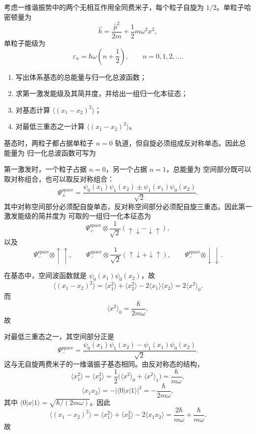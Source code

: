 \begin{question}
考虑一维谐振势中的两个无相互作用全同费米子，每个粒子自旋为 $1/2$。单粒子哈密顿量为
\[
\hat h=\frac{\hat p^2}{2m}+\frac12 m\omega^2 x^2,
\]
单粒子能级为
\[
\varepsilon_n=\hbar\omega\left(n+\frac12\right),
\qquad n=0,1,2,\dots.
\]

\begin{enumerate}[label=(\arabic*),leftmargin=2.5em]
  \item 写出体系基态的总能量与归一化总波函数；
  \item 求第一激发能级及其简并度，并给出一组归一化本征态；
  \item 对基态计算 $\langle (x_1-x_2)^2\rangle$；
  \item 对最低三重态之一计算 $\langle (x_1-x_2)^2\rangle$。
\end{enumerate}

\begin{solution}
基态时，两粒子都占据单粒子 $n=0$ 轨道，但自旋必须组成反对称单态。因此总能量为
归一化总波函数可写为

第一激发时，一个粒子占据 $n=0$，另一个占据 $n=1$，总能量为
空间部分既可以取对称组合，也可以取反对称组合：
\[
\Psi_{\pm}^{\text{space}}=\frac{\psi_0(x_1)\psi_1(x_2)\pm \psi_1(x_1)\psi_0(x_2)}{\sqrt2}.
\]
其中对称空间部分必须配自旋单态，反对称空间部分必须配自旋三重态。因此第一激发能级的简并度为
可取的一组归一化本征态为
\[
\Psi_+^{\text{space}}\otimes \frac{1}{\sqrt2}(\uparrow\downarrow-\downarrow\uparrow),
\]
以及
\[
\Psi_-^{\text{space}}\otimes \uparrow\uparrow,
\qquad
\Psi_-^{\text{space}}\otimes \frac{1}{\sqrt2}(\uparrow\downarrow+\downarrow\uparrow),
\qquad
\Psi_-^{\text{space}}\otimes \downarrow\downarrow.
\]

在基态中，空间波函数就是 $\psi_0(x_1)\psi_0(x_2)$，故
\[
\langle (x_1-x_2)^2\rangle=\langle x_1^2\rangle+\langle x_2^2\rangle-2\langle x_1\rangle\langle x_2\rangle=2\langle x^2\rangle_0.
\]
而
\[
\langle x^2\rangle_0=\frac{\hbar}{2m\omega},
\]
故

对最低三重态之一，其空间部分正是
\[
\Psi_-^{\text{space}}=\frac{\psi_0(x_1)\psi_1(x_2)-\psi_1(x_1)\psi_0(x_2)}{\sqrt2}.
\]
这与无自旋两费米子的一维谐振子基态相同。由反对称态的结构，
\[
\langle x_1^2\rangle=\langle x_2^2\rangle=\frac12\bigl(\langle x^2\rangle_0+\langle x^2\rangle_1\bigr)=\frac{\hbar}{m\omega},
\]
\[
\langle x_1 x_2\rangle=-|\langle 0|x|1\rangle|^2=-\frac{\hbar}{2m\omega},
\]
其中 $\langle 0|x|1\rangle=\sqrt{\hbar/(2m\omega)}$。因此
\[
\langle (x_1-x_2)^2\rangle
=\langle x_1^2\rangle+\langle x_2^2\rangle-2\langle x_1 x_2\rangle
=\frac{2\hbar}{m\omega}+\frac{\hbar}{m\omega}.
\]
故
\end{solution}
\end{question}

